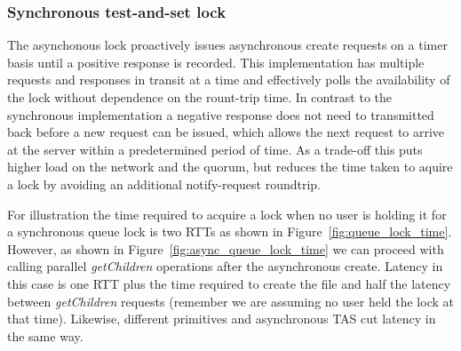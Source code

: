 \subsubsection{Synchronous test-and-set lock}

The asynchonous lock proactively issues asynchronous create requests on a timer basis until a positive response is recorded. This implementation has multiple requests and responses in transit at a time and effectively polls the availability of the lock without dependence on the rount-trip time. In contrast to the synchronous implementation a negative response does not need to transmitted back before a new request can be issued, which allows the next request to arrive at the server within a predetermined period of time. As a trade-off this puts higher load on the network and the quorum, but reduces the time taken to aquire a lock by avoiding an additional notify-request roundtrip.

For illustration the time required to acquire a lock when no user is holding it for a synchronous queue lock is two RTTs as shown in Figure~\ref{fig:queue_lock_time}. However, as shown in Figure~\ref{fig:async_queue_lock_time} we can proceed with calling parallel \emph{getChildren} operations after the asynchronous create. Latency in this case is one RTT plus the time required to create the file and half the latency between \emph{getChildren} requests (remember we are assuming no user held the lock at that time). Likewise, different primitives and asynchronous TAS cut latency in the same way.

